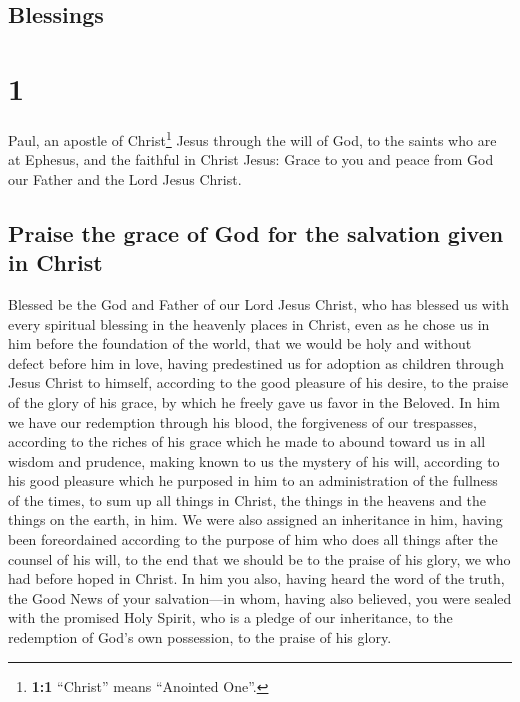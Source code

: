 \hypertarget{blessings}{%
\subsection{Blessings}\label{blessings}}

\hypertarget{section}{%
\section{1}\label{section}}

 Paul, an apostle of Christ\footnote{\textbf{1:1}
  ``Christ'' means ``Anointed One''.} Jesus through the will of God, to
the saints who are at Ephesus, and the faithful in Christ Jesus:
 Grace to you and peace from God our Father and the Lord
Jesus Christ.

\hypertarget{praise-the-grace-of-god-for-the-salvation-given-in-christ}{%
\subsection{Praise the grace of God for the salvation given in
Christ}\label{praise-the-grace-of-god-for-the-salvation-given-in-christ}}

 Blessed be the God and Father of our Lord Jesus Christ,
who has blessed us with every spiritual blessing in the heavenly places
in Christ,  even as he chose us in him before the
foundation of the world, that we would be holy and without defect before
him in love,  having predestined us for adoption as
children through Jesus Christ to himself, according to the good pleasure
of his desire,  to the praise of the glory of his grace,
by which he freely gave us favor in the Beloved.  In him
we have our redemption through his blood, the forgiveness of our
trespasses, according to the riches of his grace  which he
made to abound toward us in all wisdom and prudence, 
making known to us the mystery of his will, according to his good
pleasure which he purposed in him  to an administration
of the fullness of the times, to sum up all things in Christ, the things
in the heavens and the things on the earth, in him.  We
were also assigned an inheritance in him, having been foreordained
according to the purpose of him who does all things after the counsel of
his will,  to the end that we should be to the praise of
his glory, we who had before hoped in Christ.  In him you
also, having heard the word of the truth, the Good News of your
salvation---in whom, having also believed, you were sealed with the
promised Holy Spirit,  who is a pledge of our
inheritance, to the redemption of God's own possession, to the praise of
his glory.

